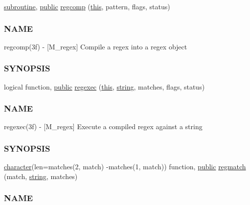 \begin{DoxyCompactItemize}
\item 
\hyperlink{M__stopwatch_83_8txt_acfbcff50169d691ff02d4a123ed70482}{subroutine}, \hyperlink{M__stopwatch_83_8txt_a2f74811300c361e53b430611a7d1769f}{public} \hyperlink{namespacem__regex_ac4e468cb031565f4f4744d8f4c9eee91}{regcomp} (\hyperlink{M__stopwatch_83_8txt_ad62a52042bb610eee5b36b5516caec22}{this}, pattern, flags, status)
\begin{DoxyCompactList}\small\item\em \subsubsection*{N\+A\+ME}

regcomp(3f) -\/ \mbox{[}M\+\_\+regex\mbox{]} Compile a regex into a regex object \subsubsection*{S\+Y\+N\+O\+P\+S\+IS}\end{DoxyCompactList}\item 
logical function, \hyperlink{M__stopwatch_83_8txt_a2f74811300c361e53b430611a7d1769f}{public} \hyperlink{namespacem__regex_a44394d605b1a98fb246bc4622a08f878}{regexec} (\hyperlink{M__stopwatch_83_8txt_ad62a52042bb610eee5b36b5516caec22}{this}, \hyperlink{what__overview_81_8txt_a74cb7e955273b9f9157b4f0c18a38849}{string}, matches, flags, status)
\begin{DoxyCompactList}\small\item\em \subsubsection*{N\+A\+ME}

regexec(3f) -\/ \mbox{[}M\+\_\+regex\mbox{]} Execute a compiled regex against a string \subsubsection*{S\+Y\+N\+O\+P\+S\+IS}\end{DoxyCompactList}\item 
\hyperlink{option__stopwatch_83_8txt_abd4b21fbbd175834027b5224bfe97e66}{character}(len=matches(2, match) -\/matches(1, match)) function, \hyperlink{M__stopwatch_83_8txt_a2f74811300c361e53b430611a7d1769f}{public} \hyperlink{namespacem__regex_a87c92921c53d800b316b0772140a8373}{regmatch} (match, \hyperlink{what__overview_81_8txt_a74cb7e955273b9f9157b4f0c18a38849}{string}, matches)
\begin{DoxyCompactList}\small\item\em \subsubsection*{N\+A\+ME}


\end{DoxyCompactList}
\end{DoxyCompactItemize}
